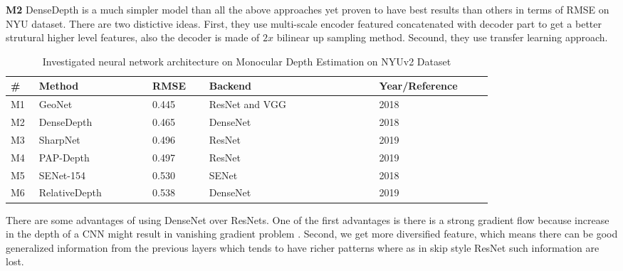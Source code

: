\textbf{M2} DenseDepth is a much simpler model than all the above approaches yet proven to have best results than others in terms of RMSE on NYU dataset. There are two distictive  ideas. First, they use multi-scale encoder featured concatenated with decoder part to get a better strutural higher level features, also the decoder is made of \(2 x \) bilinear up sampling method. Secound, they use transfer learning approach.  

\begin{table}[t]
\centering
\begin{tabular}{p{0.05\linewidth}p{0.2\linewidth}p{0.1\linewidth}p{0.3\linewidth}p{0.2\linewidth}}


\hline
\textbf{\# } & \textbf{Method} & \textbf{RMSE} & \textbf{Backend}& \textbf{Year/Reference} \\ \hline\hline
M1              & GeoNet          & 0.445             & ResNet and VGG  & 2018 \cite{qi2018geonet}          \\ \hline
M2              & DenseDepth      & 0.465             & DenseNet        & 2018 \cite{Alhashim2018}         \\ \hline
M3              & SharpNet        & 0.496             & ResNet       & 2019 \cite{ramamonjisoa2019sharpnet}\\ \hline
M4              & PAP-Depth       & 0.497             & ResNet          & 2019 \cite{Zhang_2019_CVPR}         \\ \hline
M5              & SENet-154       & 0.530             & SENet           & 2018 \cite{hu2019revisiting}          \\ \hline
M6              & RelativeDepth   & 0.538             & DenseNet        & 2019 \cite{lee2019monocular}          \\ \hline
\end{tabular}

\caption{Investigated neural network architecture on Monocular Depth Estimation on NYUv2 Dataset}
\label{table:RelatedWork_STA_Architecture}

\end{table}


There are some advantages of using DenseNet over ResNets. One of the first advantages is there is a strong gradient flow because increase in the depth of a CNN might result in vanishing gradient problem . Second, we get more diversified feature, which means there can be good generalized information from the previous layers which tends to have richer patterns where as in skip style ResNet such information are lost. 

